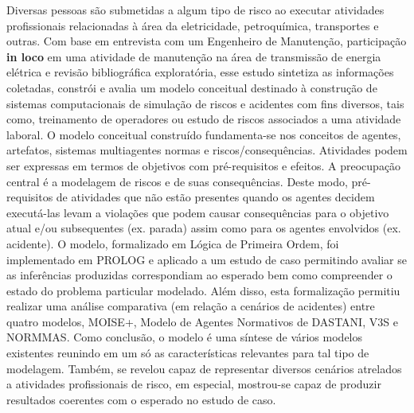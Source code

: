 Diversas pessoas são submetidas a algum tipo de risco ao executar atividades profissionais relacionadas à área da eletricidade, petroquímica, transportes e outras. Com base em entrevista com um Engenheiro de Manutenção, participação \textbf{in loco} em uma atividade de manutenção na área de transmissão de energia elétrica e revisão bibliográfica exploratória, esse estudo sintetiza as informações coletadas, constrói e avalia um modelo conceitual destinado à construção de sistemas computacionais de simulação de riscos e acidentes com fins diversos, tais como, treinamento de operadores ou estudo de riscos associados a uma atividade laboral. O modelo conceitual construído fundamenta-se nos conceitos de agentes, artefatos, sistemas multiagentes normas e riscos/consequências. Atividades podem ser expressas em termos de objetivos com pré-requisitos e efeitos. A preocupação central é a modelagem de riscos e de suas consequências. Deste modo, pré-requisitos de atividades que não estão presentes quando os agentes decidem executá-las levam a violações que podem causar consequências para o objetivo atual e/ou subsequentes (ex. parada) assim como para os agentes envolvidos (ex. acidente). O modelo, formalizado em Lógica de Primeira Ordem, foi implementado em PROLOG e aplicado a um estudo de caso permitindo avaliar se as inferências produzidas correspondiam ao esperado bem como compreender o estado do problema particular modelado. Além disso, esta formalização permitiu realizar uma análise comparativa (em relação a cenários de acidentes) entre quatro modelos, MOISE+, Modelo de Agentes Normativos de DASTANI, V3S e NORMMAS. Como conclusão, o modelo é uma síntese de vários modelos existentes reunindo em um só as características relevantes para tal tipo de modelagem. Também, se revelou capaz de representar diversos cenários atrelados a atividades profissionais de risco, em especial, mostrou-se capaz de produzir resultados coerentes com o esperado no estudo de caso.
